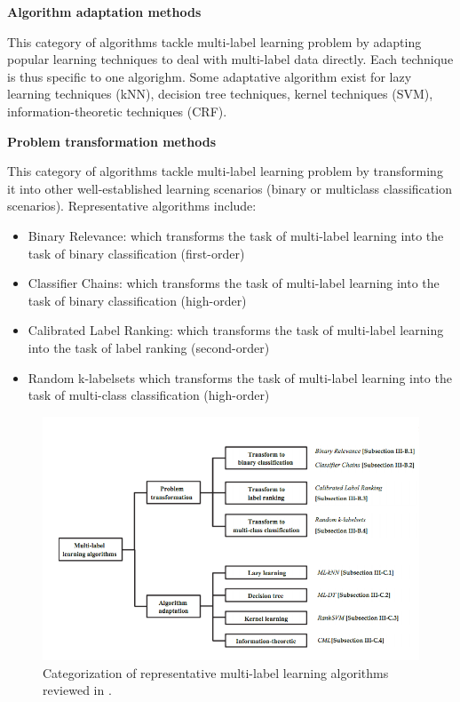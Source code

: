 \textbf{Algorithm adaptation methods}

This category of algorithms tackle multi-label learning problem by adapting popular learning techniques to deal with multi-label data directly. Each technique is thus specific to one algorighm.
Some adaptative algorithm exist for lazy learning techniques (kNN), decision tree techniques, kernel techniques (SVM), information-theoretic techniques (CRF).

\textbf{Problem transformation methods}

This category of algorithms tackle multi-label learning problem by transforming it into other well-established learning scenarios (binary or multiclass classification scenarios). 
Representative algorithms include:
\begin{itemize}
 \item Binary Relevance: which transforms the task of multi-label learning into the task of binary classification (first-order)
 \item Classifier Chains: which transforms the task of multi-label learning into the task of binary classification (high-order)
 \item Calibrated Label Ranking: which transforms the task of multi-label learning into the task of label ranking (second-order)
 \item Random k-labelsets which transforms the task of multi-label learning into the task of multi-class classification (high-order)
\end{itemize}

\begin{figure}[H]
\centering
\includegraphics[scale=0.6]{./images/machine-learning/multi-label-approaches.png}
\caption{Categorization of representative multi-label learning algorithms reviewed in \cite[this paper]{MultilabelReview}.}
\label{fig:multilabelOverview}
\end{figure}




